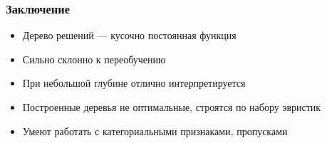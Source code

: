 \documentclass{beamer}
\begin{document}
	\begin{frame}
		\frametitle{Заключение}

		\begin{itemize}
			\item Дерево решений --- кусочно постоянная функция
			\item Сильно склонно к переобучению
			\item При небольшой глубине отлично интерпретируется
			\item Построенные деревья не оптимальные, строятся по набору эвристик
			\item Умеют работать с категориальными признаками, пропусками
		\end{itemize}
	\end{frame}
\end{document}
